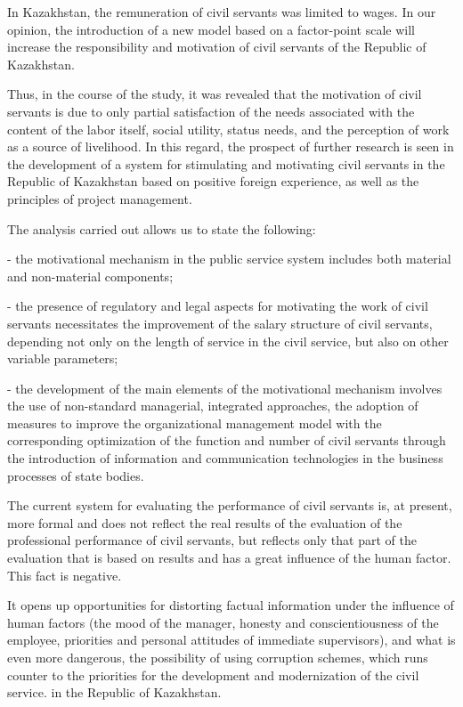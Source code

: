 \begin{multicols}{2}
In Kazakhstan, the remuneration of civil servants was limited to wages.
In our opinion, the introduction of a new model based on a factor-point
scale will increase the responsibility and motivation of civil servants
of the Republic of Kazakhstan.

Thus, in the course of the study, it was revealed that the motivation of
civil servants is due to only partial satisfaction of the needs
associated with the content of the labor itself, social utility, status
needs, and the perception of work as a source of livelihood. In this
regard, the prospect of further research is seen in the development of a
system for stimulating and motivating civil servants in the Republic of
Kazakhstan based on positive foreign experience, as well as the
principles of project management.

The analysis carried out allows us to state the following:

- the motivational mechanism in the public service system includes both
material and non-material components;

- the presence of regulatory and legal aspects for motivating the work
of civil servants necessitates the improvement of the salary structure
of civil servants, depending not only on the length of service in the
civil service, but also on other variable parameters;

- the development of the main elements of the motivational mechanism
involves the use of non-standard managerial, integrated approaches, the
adoption of measures to improve the organizational management model with
the corresponding optimization of the function and number of civil
servants through the introduction of information and communication
technologies in the business processes of state bodies.

The current system for evaluating the performance of civil servants is,
at present, more formal and does not reflect the real results of the
evaluation of the professional performance of civil servants, but
reflects only that part of the evaluation that is based on results and
has a great influence of the human factor. This fact is negative.

It opens up opportunities for distorting factual information under the
influence of human factors (the mood of the manager, honesty and
conscientiousness of the employee, priorities and personal attitudes of
immediate supervisors), and what is even more dangerous, the possibility
of using corruption schemes, which runs counter to the priorities for
the development and modernization of the civil service. in the Republic
of Kazakhstan.


\end{multicols}
